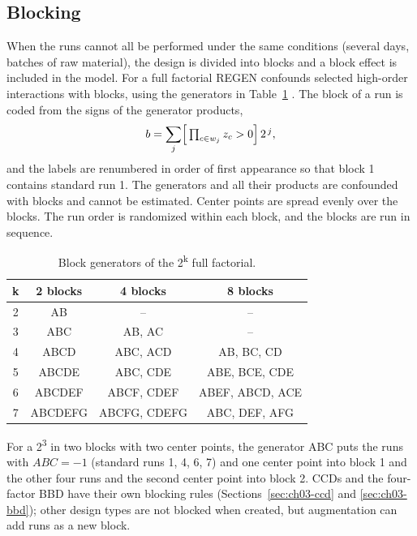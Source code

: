 \subsection{Blocking}
\label{sec:ch03-blocks}
When the runs cannot all be performed under the same conditions (several days, batches of raw material), the design
is divided into blocks and a block effect is included in the model. For a full factorial REGEN confounds selected
high-order interactions with blocks, using the generators in Table~\ref{tab:ch03-blockgen}
\citep{montgomery2017}. The block of a run is coded from the signs of the generator products,
\begin{equation}
b = \sum_{j} \Bigl[\,\textstyle\prod_{c \in w_j} z_c > 0\Bigr]\, 2^{\,j},
\label{eq:ch03-blocklabel}
\end{equation}
and the labels are renumbered in order of first appearance so that block 1 contains standard run 1. The generators
and all their products are confounded with blocks and cannot be estimated. Center points are spread evenly over the
blocks. The run order is randomized within each block, and the blocks are run in sequence.

\begin{table}[htbp]
\centering
\caption{Block generators of the 2\textsuperscript{k} full factorial.}
\label{tab:ch03-blockgen}
\small
\begin{tabular}{@{}cccc@{}}
\toprule
k & 2 blocks & 4 blocks & 8 blocks \\
\midrule
2 & AB & -- & -- \\
3 & ABC & AB, AC & -- \\
4 & ABCD & ABC, ACD & AB, BC, CD \\
5 & ABCDE & ABC, CDE & ABE, BCE, CDE \\
6 & ABCDEF & ABCF, CDEF & ABEF, ABCD, ACE \\
7 & ABCDEFG & ABCFG, CDEFG & ABC, DEF, AFG \\
\bottomrule
\end{tabular}
\end{table}

For a 2\textsuperscript{3} in two blocks with two center points, the generator ABC puts the runs with $ABC = -1$
(standard runs 1, 4, 6, 7) and one center point into block 1 and the other four runs and the second center point into
block 2. CCDs and the four-factor BBD have their own blocking rules (Sections~\ref{sec:ch03-ccd} and
\ref{sec:ch03-bbd}); other design types are not blocked when created, but augmentation can add runs as a new block.

